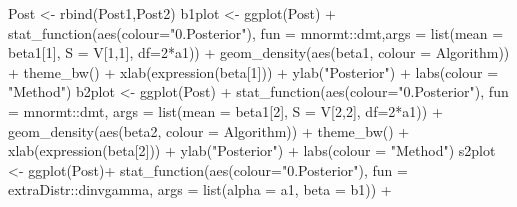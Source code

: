 \documentclass[
]{book}
\newenvironment{Shaded}{\begin{snugshade}}{\end{snugshade}}
\newcommand{\AttributeTok}[1]{\textcolor[rgb]{0.77,0.63,0.00}{#1}}
\newcommand{\DecValTok}[1]{\textcolor[rgb]{0.00,0.00,0.81}{#1}}
\newcommand{\FunctionTok}[1]{\textcolor[rgb]{0.00,0.00,0.00}{#1}}
\newcommand{\NormalTok}[1]{#1}
\newcommand{\OtherTok}[1]{\textcolor[rgb]{0.56,0.35,0.01}{#1}}
\newcommand{\SpecialCharTok}[1]{\textcolor[rgb]{0.00,0.00,0.00}{#1}}
\newcommand{\StringTok}[1]{\textcolor[rgb]{0.31,0.60,0.02}{#1}}
\begin{document}
\begin{Shaded}
\begin{Highlighting}[]
\NormalTok{Post }\OtherTok{\textless{}{-}} \FunctionTok{rbind}\NormalTok{(Post1,Post2)}
\NormalTok{b1plot }\OtherTok{\textless{}{-}} \FunctionTok{ggplot}\NormalTok{(Post) }\SpecialCharTok{+}
  \FunctionTok{stat\_function}\NormalTok{(}\FunctionTok{aes}\NormalTok{(}\AttributeTok{colour=}\StringTok{"0.Posterior"}\NormalTok{), }\AttributeTok{fun =}\NormalTok{ mnormt}\SpecialCharTok{::}\NormalTok{dmt,}\AttributeTok{args =} \FunctionTok{list}\NormalTok{(}\AttributeTok{mean =}\NormalTok{ beta1[}\DecValTok{1}\NormalTok{], }\AttributeTok{S =}\NormalTok{ V[}\DecValTok{1}\NormalTok{,}\DecValTok{1}\NormalTok{], }\AttributeTok{df=}\DecValTok{2}\SpecialCharTok{*}\NormalTok{a1)) }\SpecialCharTok{+}
  \FunctionTok{geom\_density}\NormalTok{(}\FunctionTok{aes}\NormalTok{(beta1, }\AttributeTok{colour =}\NormalTok{ Algorithm)) }\SpecialCharTok{+} \FunctionTok{theme\_bw}\NormalTok{() }\SpecialCharTok{+}
  \FunctionTok{xlab}\NormalTok{(}\FunctionTok{expression}\NormalTok{(beta[}\DecValTok{1}\NormalTok{])) }\SpecialCharTok{+} \FunctionTok{ylab}\NormalTok{(}\StringTok{"Posterior"}\NormalTok{) }\SpecialCharTok{+} \FunctionTok{labs}\NormalTok{(}\AttributeTok{colour =} \StringTok{"Method"}\NormalTok{)}
\NormalTok{b2plot }\OtherTok{\textless{}{-}} \FunctionTok{ggplot}\NormalTok{(Post) }\SpecialCharTok{+}
  \FunctionTok{stat\_function}\NormalTok{(}\FunctionTok{aes}\NormalTok{(}\AttributeTok{colour=}\StringTok{"0.Posterior"}\NormalTok{), }\AttributeTok{fun =}\NormalTok{ mnormt}\SpecialCharTok{::}\NormalTok{dmt, }\AttributeTok{args =} \FunctionTok{list}\NormalTok{(}\AttributeTok{mean =}\NormalTok{ beta1[}\DecValTok{2}\NormalTok{], }\AttributeTok{S =}\NormalTok{ V[}\DecValTok{2}\NormalTok{,}\DecValTok{2}\NormalTok{], }\AttributeTok{df=}\DecValTok{2}\SpecialCharTok{*}\NormalTok{a1)) }\SpecialCharTok{+}
  \FunctionTok{geom\_density}\NormalTok{(}\FunctionTok{aes}\NormalTok{(beta2, }\AttributeTok{colour =}\NormalTok{ Algorithm)) }\SpecialCharTok{+} \FunctionTok{theme\_bw}\NormalTok{() }\SpecialCharTok{+}
  \FunctionTok{xlab}\NormalTok{(}\FunctionTok{expression}\NormalTok{(beta[}\DecValTok{2}\NormalTok{])) }\SpecialCharTok{+} \FunctionTok{ylab}\NormalTok{(}\StringTok{"Posterior"}\NormalTok{) }\SpecialCharTok{+} \FunctionTok{labs}\NormalTok{(}\AttributeTok{colour =} \StringTok{"Method"}\NormalTok{)}
\NormalTok{s2plot }\OtherTok{\textless{}{-}} \FunctionTok{ggplot}\NormalTok{(Post)}\SpecialCharTok{+}
  \FunctionTok{stat\_function}\NormalTok{(}\FunctionTok{aes}\NormalTok{(}\AttributeTok{colour=}\StringTok{"0.Posterior"}\NormalTok{), }\AttributeTok{fun =}\NormalTok{ extraDistr}\SpecialCharTok{::}\NormalTok{dinvgamma, }\AttributeTok{args =} \FunctionTok{list}\NormalTok{(}\AttributeTok{alpha =}\NormalTok{ a1, }\AttributeTok{beta =}\NormalTok{ b1)) }\SpecialCharTok{+}

\end{Highlighting}
\end{Shaded}
\end{document}
